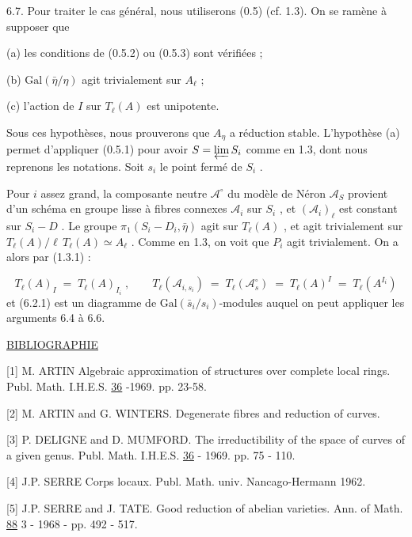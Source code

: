 6.7. Pour traiter le cas général, nous utiliserons (0.5) (cf. 1.3). On se ramène à supposer que



(a) les conditions de (0.5.2) ou (0.5.3)  sont vérifiées ;

(b) $\mathrm{Gal}(\bar{\eta}/\eta)$  agit trivialement sur  $A_\ell$ ;

(c) l'action de  $I$  sur  $T_\ell(A)$  est unipotente.

Sous ces hypothèses, nous prouverons que  $A_\eta$  a réduction stable. L'hypothèse (a) permet d'appliquer (0.5.1) pour avoir  $S = \varprojlim S_i$  comme en 1.3, dont nous reprenons les notations. Soit  $s_i$  le point fermé de  $S_i$ .

Pour  $i$  assez grand, la composante neutre  $\mathcal{A}^\circ$  du modèle de Néron  $\mathcal{A}_S$  provient d'un schéma en groupe lisse à fibres connexes  $\mathcal{A}_i$  sur  $S_i$ , et  $(\mathcal{A}_i)_\ell$  est constant sur  $S_i - D$ . Le groupe  $\pi_1(S_i - D_i , \bar{\eta})$  agit sur  $T_\ell(A)$ , et agit trivialement sur  $T_\ell(A)/\ell\, T_\ell(A) \simeq A_\ell$ . Comme en 1.3, on voit que  $P_i$  agit trivialement. On a alors par (1.3.1) :

\begin{equation*}
T_\ell(A)_I \;=\; T_\ell(A)_{I_i} \;,\qquad T_\ell(\mathcal{A}_{i,s_i}) \;=\; T_\ell(\mathcal{A}^\circ_s) \;=\; T_\ell(A)^I \;=\; T_\ell(A^{I_i})
\end{equation*}
et (6.2.1) est un diagramme de  $\mathrm{Gal}(\bar{s}_i/s_i)$-modules auquel on peut appliquer les arguments 6.4 à 6.6.




\underline{BIBLIOGRAPHIE}

[1]	M. ARTIN	Algebraic approximation of structures over complete local rings. Publ. Math. I.H.E.S. \underline{36} -1969. pp. 23-58.

[2]	M. ARTIN and G. WINTERS. Degenerate fibres and reduction of curves.

[3]	P. DELIGNE and D. MUMFORD. The irreductibility of the space of curves of a given genus. Publ. Math. I.H.E.S. \underline{36} - 1969. pp. 75 - 110.

[4]	J.P. SERRE	Corps locaux. Publ. Math. univ. Nancago-Hermann 1962.

[5]	J.P. SERRE and J. TATE. Good reduction of abelian varieties. Ann. of Math. \underline{88} 3 - 1968 - pp. 492 - 517.
